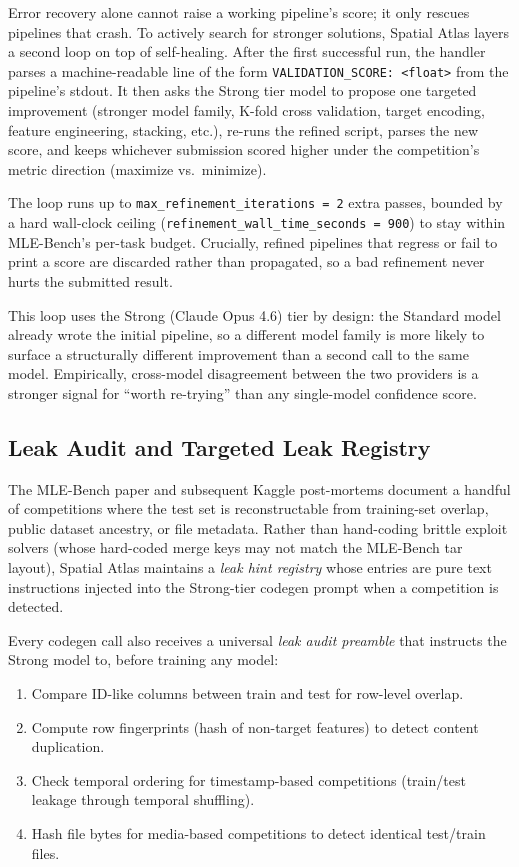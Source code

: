 \documentclass[11pt]{article}
\begin{document}
Error recovery alone cannot raise a working pipeline's score; it only rescues pipelines that crash. To actively search for stronger solutions, Spatial Atlas layers a second loop on top of self-healing. After the first successful run, the handler parses a machine-readable line of the form \texttt{VALIDATION\_SCORE: <float>} from the pipeline's stdout. It then asks the Strong tier model to propose one targeted improvement (stronger model family, K-fold cross validation, target encoding, feature engineering, stacking, etc.), re-runs the refined script, parses the new score, and keeps whichever submission scored higher under the competition's metric direction (maximize vs.\ minimize).

The loop runs up to \texttt{max\_refinement\_iterations\,=\,2} extra passes, bounded by a hard wall-clock ceiling (\texttt{refinement\_wall\_time\_seconds\,=\,900}) to stay within MLE-Bench's per-task budget. Crucially, refined pipelines that regress or fail to print a score are discarded rather than propagated, so a bad refinement never hurts the submitted result.

This loop uses the Strong (Claude Opus 4.6) tier by design: the Standard model already wrote the initial pipeline, so a different model family is more likely to surface a structurally different improvement than a second call to the same model. Empirically, cross-model disagreement between the two providers is a stronger signal for ``worth re-trying'' than any single-model confidence score.

\subsection{Leak Audit and Targeted Leak Registry}

The MLE-Bench paper and subsequent Kaggle post-mortems document a handful of competitions where the test set is reconstructable from training-set overlap, public dataset ancestry, or file metadata. Rather than hand-coding brittle exploit solvers (whose hard-coded merge keys may not match the MLE-Bench tar layout), Spatial Atlas maintains a \emph{leak hint registry} whose entries are pure text instructions injected into the Strong-tier codegen prompt when a competition is detected.

Every codegen call also receives a universal \emph{leak audit preamble} that instructs the Strong model to, before training any model:

\begin{enumerate}[leftmargin=*,itemsep=1pt]
  \item Compare ID-like columns between train and test for row-level overlap.
  \item Compute row fingerprints (hash of non-target features) to detect content duplication.
  \item Check temporal ordering for timestamp-based competitions (train/test leakage through temporal shuffling).
  \item Hash file bytes for media-based competitions to detect identical test/train files.
\end{enumerate}
\end{document}
